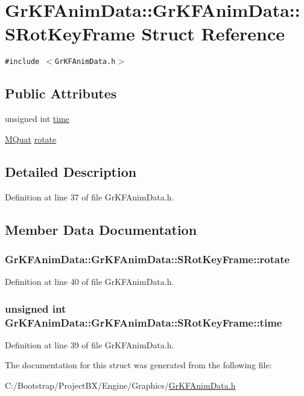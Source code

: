 \hypertarget{struct_gr_k_f_anim_data_1_1_s_rot_key_frame}{
\section{GrKFAnimData::GrKFAnimData::SRotKeyFrame Struct Reference}
\label{struct_gr_k_f_anim_data_1_1_s_rot_key_frame}
}
{\tt \#include $<$GrKFAnimData.h$>$}

\subsection*{Public Attributes}
\begin{CompactItemize}
\item 
unsigned int \hyperlink{struct_gr_k_f_anim_data_1_1_s_rot_key_frame_bfd66aea30ab2da0a953e1d0128b8fa2}{time}
\item 
\hyperlink{class_m_quat}{MQuat} \hyperlink{struct_gr_k_f_anim_data_1_1_s_rot_key_frame_1146bafdfe5f8a2cee72cef8642cf1ff}{rotate}
\end{CompactItemize}


\subsection{Detailed Description}


Definition at line 37 of file GrKFAnimData.h.

\subsection{Member Data Documentation}
\hypertarget{struct_gr_k_f_anim_data_1_1_s_rot_key_frame_1146bafdfe5f8a2cee72cef8642cf1ff}{
\subsubsection[{rotate}]{ GrKFAnimData::GrKFAnimData::SRotKeyFrame::rotate}}
\label{struct_gr_k_f_anim_data_1_1_s_rot_key_frame_1146bafdfe5f8a2cee72cef8642cf1ff}




Definition at line 40 of file GrKFAnimData.h.\hypertarget{struct_gr_k_f_anim_data_1_1_s_rot_key_frame_bfd66aea30ab2da0a953e1d0128b8fa2}{
\subsubsection[{time}]{\setlength{\rightskip}{0pt plus 5cm}unsigned int GrKFAnimData::GrKFAnimData::SRotKeyFrame::time}}
\label{struct_gr_k_f_anim_data_1_1_s_rot_key_frame_bfd66aea30ab2da0a953e1d0128b8fa2}




Definition at line 39 of file GrKFAnimData.h.

The documentation for this struct was generated from the following file:\begin{CompactItemize}
\item 
C:/Bootstrap/ProjectBX/Engine/Graphics/\hyperlink{_gr_k_f_anim_data_8h}{GrKFAnimData.h}\end{CompactItemize}
